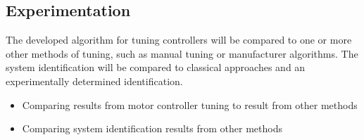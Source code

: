 \subsection{Experimentation}

The developed algorithm for tuning controllers will be compared to one or more other methods of tuning, such as manual tuning or manufacturer algorithms.
The system identification will be compared to classical approaches and an experimentally determined identification. 

\begin{itemize}
	\setlength\itemsep{\pdescitemsep}
	\item Comparing results from motor controller tuning to result from other methods
	\item Comparing system identification results from other methods
\end{itemize}

